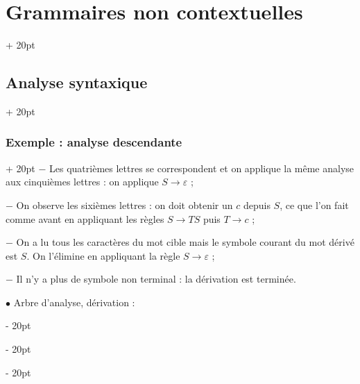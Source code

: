 \documentclass[a4paper, 12pt, twoside]{article}
\newcommand{\ind}[1][20pt]{\advance\leftskip + #1}
\newcommand{\deind}[1][20pt]{\advance\leftskip - #1}
\newenvironment{indt}[2][20pt]{#2 \par \ind[#1]}{\par \deind} %
\begin{document}
\begin{indt}{\section{Grammaires non contextuelles}}
\begin{indt}{\subsection{Analyse syntaxique}}
\begin{indt}{\subsubsection{Exemple : analyse descendante}}
                $-$ Les quatrièmes lettres se correspondent et on applique la même analyse aux cinquièmes lettres : on applique $S \rightarrow \varepsilon$ ;

                $-$ On observe les sixièmes lettres : on doit obtenir un $c$ depuis $S$, ce que l'on fait comme avant en appliquant les règles $S \rightarrow TS$ puis $T \rightarrow c$ ;

                $-$ On a lu tous les caractères du mot cible mais le symbole courant du mot dérivé est $S$. On l'élimine en appliquant la règle $S \rightarrow \varepsilon$ ;

                $-$ Il n'y a plus de symbole non terminal : la dérivation est terminée.

                \vspace{12pt}
                
                $\bullet$ Arbre d'analyse, dérivation :

                \begin{center}
\end{center}
\end{indt}
\end{indt}
\end{indt}
\end{document}

